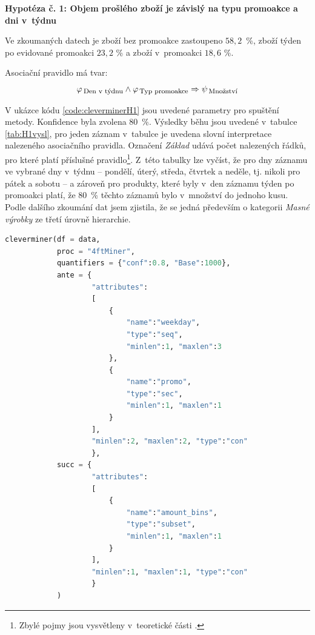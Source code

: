 \textbf{Hypotéza č. 1: Objem prošlého zboží je závislý na typu promoakce a dni v~týdnu}

Ve zkoumaných datech je zboží bez promoakce zastoupeno $58{,}2$~\%, zboží týden po evidované promoakci $23{,}2$ \% a zboží v~promoakci $18{,}6$ \%. 

Asociační pravidlo má tvar:
\begin{equation}
    \varphi_{\mbox{\,\footnotesize Den v~týdnu}} \land \varphi_{\,\mbox{\footnotesize Typ promoakce}} \Rightarrow \psi_{\mbox{\,\footnotesize Množství}}
\end{equation}

V ukázce kódu \ref*{code:cleverminerH1} jsou uvedené parametry pro spuštění metody. Konfidence byla zvolena 80~\%. Výsledky běhu jsou uvedené v~tabulce \ref*{tab:H1vysl}, pro jeden záznam v~tabulce je uvedena slovní interpretace nalezeného asociačního pravidla. Označení \emph{Základ} udává počet nalezených řádků, pro které platí příslušné pravidlo\footnote{Zbylé pojmy jsou vysvětleny v~teoretické části \label{sec:clever:pojmy}.}.  Z~této tabulky lze vyčíst, že pro dny záznamu ve vybrané dny v~týdnu -- pondělí, úterý, středa, čtvrtek a neděle, tj. nikoli pro pátek a sobotu -- a zároveň pro produkty, které byly v~den záznamu týden po promoakci platí, že 80~\% těchto záznamů bylo v~množství do jednoho kusu. Podle dalšího zkoumání dat jsem zjistila, že se jedná především o kategorii \emph{Masné výrobky} ze třetí úrovně hierarchie.


\begin{lstlisting}[language=Python, style=mystyle, label={code:cleverminerH1}, caption={Hypotéza č. 1, funkce \texttt{cleverminer}.}]
cleverminer(df = data,
            proc = "4ftMiner", 
            quantifiers = {"conf":0.8, "Base":1000},
            ante = {
                    "attributes":
                    [
                        {
                            "name":"weekday", 
                            "type":"seq", 
                            "minlen":1, "maxlen":3
                        },
                        {
                            "name":"promo", 
                            "type":"sec", 
                            "minlen":1, "maxlen":1
                        }
                    ], 
                    "minlen":2, "maxlen":2, "type":"con"
                    },
            succ = {
                    "attributes":
                    [
                        {
                            "name":"amount_bins", 
                            "type":"subset", 
                            "minlen":1, "maxlen":1
                        }
                    ], 
                    "minlen":1, "maxlen":1, "type":"con"
                    }
            )
    \end{lstlisting}

